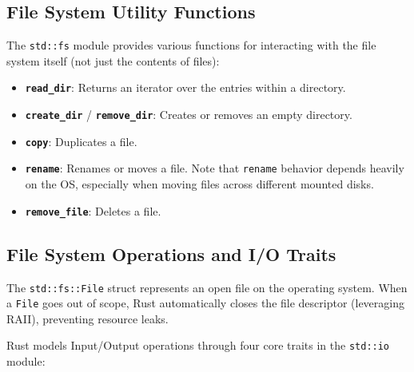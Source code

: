 \subsection{File System Utility Functions}
The \texttt{std::fs} module provides various functions for interacting with the file system itself (not just the contents of files):
\begin{itemize}
    \item \textbf{\texttt{read\_dir}}: Returns an iterator over the entries within a directory.
    \item \textbf{\texttt{create\_dir}} / \textbf{\texttt{remove\_dir}}: Creates or removes an empty directory.
    \item \textbf{\texttt{copy}}: Duplicates a file.
    \item \textbf{\texttt{rename}}: Renames or moves a file. Note that \texttt{rename} behavior depends heavily on the OS, especially when moving files across different mounted disks.
    \item \textbf{\texttt{remove\_file}}: Deletes a file.
\end{itemize}

\subsection{File System Operations and I/O Traits}
The \texttt{std::fs::File} struct represents an open file on the operating system. When a \texttt{File} goes out of scope, Rust automatically closes the file descriptor (leveraging RAII), preventing resource leaks. 


Rust models Input/Output operations through four core traits in the \texttt{std::io} module:

